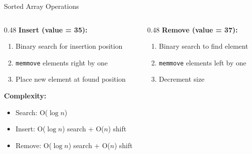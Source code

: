 \documentclass[aspectratio=169, 10pt]{beamer}
\begin{document}
\begin{frame}{Sorted Array Operations}
\begin{columns}[T]
\begin{column}{0.48\textwidth}
\textbf{Insert (value = 35):}
\begin{enumerate}
  \item Binary search for insertion position
  \item \texttt{memmove} elements right by one
  \item Place new element at found position
\end{enumerate}

\vspace{0.5em}
\begin{center}
\end{center}

\vspace{0.5em}
\textbf{Complexity:}
\begin{itemize}
  \item Search: O($\log n$)
  \item Insert: O($\log n$) search + O($n$) shift
  \item Remove: O($\log n$) search + O($n$) shift
\end{itemize}
\end{column}

\begin{column}{0.48\textwidth}
\textbf{Remove (value = 37):}
\begin{enumerate}
  \item Binary search to find element
  \item \texttt{memmove} elements left by one
  \item Decrement size
\end{enumerate}


\end{column}
\end{columns}
\end{frame}
\end{document}
